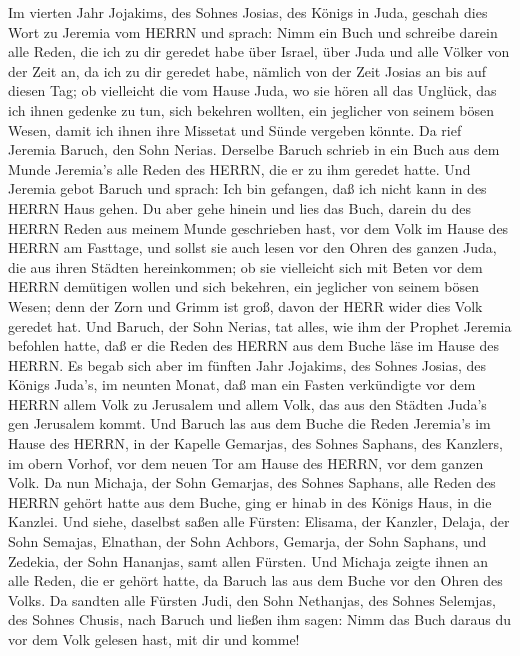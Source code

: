  Im vierten Jahr Jojakims, des Sohnes Josias, des Königs in
Juda, geschah dies Wort zu Jeremia vom HERRN und sprach: 
Nimm ein Buch und schreibe darein alle Reden, die ich zu dir geredet
habe über Israel, über Juda und alle Völker von der Zeit an, da ich zu
dir geredet habe, nämlich von der Zeit Josias an bis auf diesen Tag;
 ob vielleicht die vom Hause Juda, wo sie hören all das
Unglück, das ich ihnen gedenke zu tun, sich bekehren wollten, ein
jeglicher von seinem bösen Wesen, damit ich ihnen ihre Missetat und
Sünde vergeben könnte.  Da rief Jeremia Baruch, den Sohn
Nerias. Derselbe Baruch schrieb in ein Buch aus dem Munde Jeremia's alle
Reden des HERRN, die er zu ihm geredet hatte.  Und Jeremia
gebot Baruch und sprach: Ich bin gefangen, daß ich nicht kann in des
HERRN Haus gehen.  Du aber gehe hinein und lies das Buch,
darein du des HERRN Reden aus meinem Munde geschrieben hast, vor dem
Volk im Hause des HERRN am Fasttage, und sollst sie auch lesen vor den
Ohren des ganzen Juda, die aus ihren Städten hereinkommen; 
ob sie vielleicht sich mit Beten vor dem HERRN demütigen wollen und sich
bekehren, ein jeglicher von seinem bösen Wesen; denn der Zorn und Grimm
ist groß, davon der HERR wider dies Volk geredet hat.  Und
Baruch, der Sohn Nerias, tat alles, wie ihm der Prophet Jeremia befohlen
hatte, daß er die Reden des HERRN aus dem Buche läse im Hause des HERRN.
 Es begab sich aber im fünften Jahr Jojakims, des Sohnes
Josias, des Königs Juda's, im neunten Monat, daß man ein Fasten
verkündigte vor dem HERRN allem Volk zu Jerusalem und allem Volk, das
aus den Städten Juda's gen Jerusalem kommt.  Und Baruch las
aus dem Buche die Reden Jeremia's im Hause des HERRN, in der Kapelle
Gemarjas, des Sohnes Saphans, des Kanzlers, im obern Vorhof, vor dem
neuen Tor am Hause des HERRN, vor dem ganzen Volk.  Da nun
Michaja, der Sohn Gemarjas, des Sohnes Saphans, alle Reden des HERRN
gehört hatte aus dem Buche,  ging er hinab in des Königs
Haus, in die Kanzlei. Und siehe, daselbst saßen alle Fürsten: Elisama,
der Kanzler, Delaja, der Sohn Semajas, Elnathan, der Sohn Achbors,
Gemarja, der Sohn Saphans, und Zedekia, der Sohn Hananjas, samt allen
Fürsten.  Und Michaja zeigte ihnen an alle Reden, die er
gehört hatte, da Baruch las aus dem Buche vor den Ohren des Volks.
 Da sandten alle Fürsten Judi, den Sohn Nethanjas, des
Sohnes Selemjas, des Sohnes Chusis, nach Baruch und ließen ihm sagen:
Nimm das Buch daraus du vor dem Volk gelesen hast, mit dir und komme!

